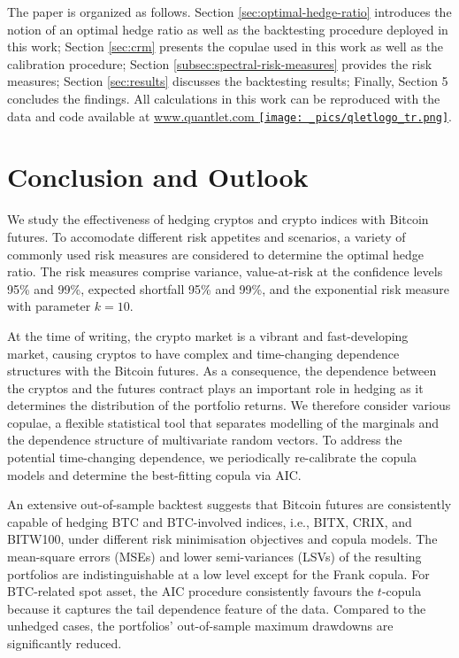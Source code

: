 \documentclass[11pt,a4paper,english]{article}
\begin{document}
The paper is organized as follows. Section \ref{sec:optimal-hedge-ratio} introduces the notion of
an optimal hedge ratio as well as the backtesting procedure deployed in this work;
Section \ref{sec:crm} presents the copulae used in this work as well as the calibration procedure;
Section \ref{subsec:spectral-risk-measures} provides the risk measures;
Section \ref{sec:results} discusses the backtesting results; Finally,
Section 5 concludes the findings. 
All calculations in this work can be reproduced with the data and code
available at \href{http://www.quantlet.com/}{www.quantlet.com
  {\texttt{[image: \_pics/qletlogo\_tr.png]}}}. 



%


\section{Conclusion and Outlook}\label{sec:conclusion-and-outlook}
We study the effectiveness of hedging cryptos and crypto indices with
Bitcoin futures.
To accomodate different risk appetites and scenarios, a variety of
commonly used risk measures are considered to determine the optimal
hedge ratio. The risk measures comprise variance, value-at-risk at
the confidence levels 95\% and 99\%, expected shortfall 95\% and 99\%,
and the exponential risk measure with parameter $k=10$.

At the time of writing, the crypto market is a vibrant and
fast-developing market, causing cryptos to have complex and
time-changing dependence structures with the Bitcoin futures.
As a consequence, the dependence between the cryptos and the futures
contract plays an important role in hedging as it determines the
distribution of the portfolio returns. We therefore consider various
copulae, a flexible statistical tool that separates modelling of the
marginals and the dependence structure of multivariate random
vectors. To address the potential time-changing dependence, we
periodically re-calibrate the copula models and determine the
best-fitting copula via AIC. 

An extensive out-of-sample backtest suggests that Bitcoin futures
are consistently capable of hedging BTC and BTC-involved indices,
i.e., BITX, CRIX, and BITW100, under different risk minimisation
objectives 
and copula models. The mean-square errors (MSEs) and lower
semi-variances (LSVs) of the resulting portfolios are
indistinguishable at a low level except for the Frank copula. 
For BTC-related spot asset, the AIC procedure consistently
favours the $t$-copula because it  
captures the tail dependence feature of the data. 
Compared to the unhedged cases, the
portfolios' out-of-sample maximum drawdowns are significantly reduced. 
\end{document}
